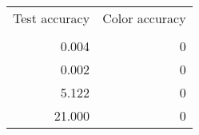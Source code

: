 \begin{tabular}{rr}
\toprule
 Test accuracy &  Color accuracy \\
               &                 \\
\midrule
         0.004 &               0 \\
         0.002 &               0 \\
         5.122 &               0 \\
        21.000 &               0 \\
\bottomrule
\end{tabular}
